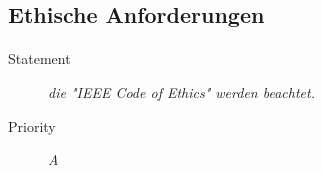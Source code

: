 \subsection{Ethische Anforderungen}

\paragraph{}
\begin{description}
\item[Statement] \textit{die "IEEE Code of Ethics" werden beachtet.}
\item[Priority] \textit{A}
\end{description}
